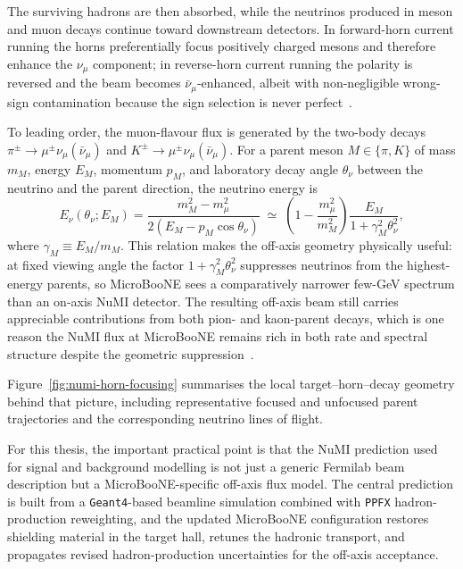 The surviving hadrons are then absorbed, while the neutrinos produced in
meson and muon decays continue toward downstream detectors. In forward-horn
current running the horns preferentially focus positively charged mesons and
therefore enhance the \(\nu_\mu\) component; in reverse-horn current running
the polarity is reversed and the beam becomes \(\bar\nu_\mu\)-enhanced, albeit
with non-negligible wrong-sign contamination because the sign selection is
never perfect~\cite{Adamson:2016NuMIBeam}.

To leading order, the muon-flavour flux is generated by the two-body decays
\(\pi^\pm\to\mu^\pm\nu_\mu(\bar\nu_\mu)\) and
\(K^\pm\to\mu^\pm\nu_\mu(\bar\nu_\mu)\). For a parent meson
\(M\in\{\pi,K\}\) of mass \(m_M\), energy \(E_M\), momentum \(p_M\), and
laboratory decay angle \(\theta_\nu\) between the neutrino and the parent
direction, the neutrino energy is
\begin{equation}
  E_\nu(\theta_\nu;E_M)
  = \frac{m_M^2-m_\mu^2}{2\left(E_M-p_M\cos\theta_\nu\right)}
  \;\simeq\;
  \left(1-\frac{m_\mu^2}{m_M^2}\right)\frac{E_M}{1+\gamma_M^2\theta_\nu^2},
  \label{eq:numi-two-body-energy}
\end{equation}
where \(\gamma_M\equiv E_M/m_M\). This relation makes the off-axis geometry
physically useful: at fixed viewing angle the factor
\(1+\gamma_M^2\theta_\nu^2\) suppresses neutrinos from the highest-energy
parents, so MicroBooNE sees a comparatively narrower few-GeV spectrum than an
on-axis NuMI detector. The resulting off-axis beam still carries appreciable
contributions from both pion- and kaon-parent decays, which is one reason the
NuMI flux at MicroBooNE remains rich in both rate and spectral structure
despite the geometric suppression~\cite{Aliaga:2016NuMIPRD}.

Figure~\ref{fig:numi-horn-focusing} summarises the local target--horn--decay
geometry behind that picture, including representative focused and unfocused
parent trajectories and the corresponding neutrino lines of flight.



For this thesis, the important practical point is that the NuMI prediction used
for signal and background modelling is not just a generic Fermilab beam
description but a MicroBooNE-specific off-axis flux model. The central
prediction is built from a \texttt{Geant4}-based beamline simulation combined
with \texttt{PPFX} hadron-production reweighting, and the updated MicroBooNE
configuration restores shielding material in the target hall, retunes the
hadronic transport, and propagates revised hadron-production uncertainties for
the off-axis acceptance.

